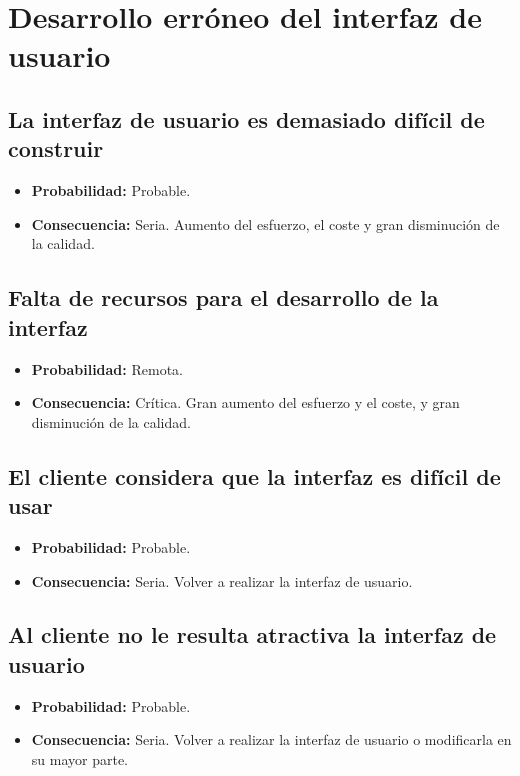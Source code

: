 \documentclass[spanish,a4paper,12pt]{report}	%
\begin{document}
%
\section{Desarrollo erróneo del interfaz de usuario}

\subsection*{La interfaz de usuario es demasiado difícil de construir}
	\begin{itemize}
		\item \textbf {Probabilidad: }Probable.
		\item \textbf {Consecuencia: }Seria. Aumento del esfuerzo, el coste y gran disminución de la calidad.
	\end{itemize}

\subsection*{Falta de recursos para el desarrollo de la interfaz}
	\begin{itemize}
		\item \textbf {Probabilidad: }Remota.
		\item \textbf {Consecuencia: }Crítica. Gran aumento del esfuerzo y el coste, y gran disminución de la calidad.
	\end{itemize}

\subsection*{El cliente considera que la interfaz es difícil de usar}
	\begin{itemize}
		\item \textbf {Probabilidad: }Probable.
		\item \textbf {Consecuencia: }Seria. Volver a realizar la interfaz de usuario.
	\end{itemize}

\subsection*{Al cliente no le resulta atractiva la interfaz de usuario}
	\begin{itemize}
		\item \textbf {Probabilidad: }Probable.
		\item \textbf {Consecuencia: }Seria. Volver a realizar la interfaz de usuario o modificarla en su mayor parte.
	\end{itemize}
\end{document}
